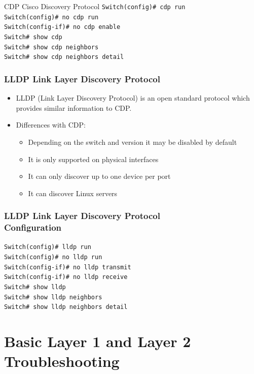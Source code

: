 \documentclass[pdflatex,compress,mathserif]{beamer}
\begin{document}
\begin{frame}{CDP Cisco Discovery Protocol}
	\texttt{Switch(config)\# cdp run \\
		Switch(config)\# no cdp run \\
		Switch(config-if)\# no cdp enable \\
		Switch\# show cdp \\
		Switch\# show cdp neighbors \\
		Switch\# show cdp neighbors detail \\}
\end{frame}

\begin{frame}
	\frametitle{LLDP Link Layer Discovery Protocol}
	\begin{itemize}
		\item LLDP (Link Layer Discovery Protocol) is an open standard protocol which provides similar information to CDP.
		\item Differences with CDP:
		\begin{itemize}
			\item Depending on the switch and version it may be disabled by default
			\item It is only supported on physical interfaces
			\item It can only discover up to one device per port
			\item It can discover Linux servers
		\end{itemize}		
	\end{itemize}
\end{frame}

\begin{frame}
	\frametitle{LLDP Link Layer Discovery Protocol\\ Configuration}
	\texttt{Switch(config)\# lldp run \\
		Switch(config)\# no lldp run \\
		Switch(config-if)\# no lldp transmit \\
		Switch(config-if)\# no lldp receive \\
		Switch\# show lldp \\
		Switch\# show lldp neighbors \\
		Switch\# show lldp neighbors detail \\}
\end{frame}

\section{Basic Layer 1 and Layer 2 Troubleshooting}
\end{document}
